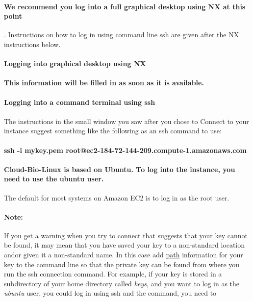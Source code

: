 \paragraph{We recommend you log into a full graphical desktop using NX at this point}. Instructions on how to log in using command line ssh are given after the NX instructions below.

\label{section:nx}
\paragraph{}\textbf{Logging into graphical desktop using NX}

\paragraph{This information will be filled in as soon as it is available.}


\paragraph{}\textbf{Logging into a command terminal using ssh}

\paragraph{}The instructions in the small window you saw after you chose to Connect to your instance suggest something like the following as an ssh command to use:

\paragraph{ssh -i mykey.pem root@ec2-184-72-144-209.compute-1.amazonaws.com}

\paragraph{Cloud-Bio-Linux is based on Ubuntu. To log into the instance, you need to \textbf{use the ubuntu user}.} The default for most systems on Amazon EC2 is to log in as the root user. 


\paragraph{Note:} If you get a warning when you try to connect that suggests that your key cannot be found, it may mean that you have saved your key to a non-standard location and\/or given it a non-standard name. In this case add \href{http://nebc.nerc.ac.uk/tools/bio-linux/bio-linux-faq\#path}{path} information for your key to the command line so that the private key can be found from where you run the ssh connection command. For example, if your key is stored in a subdirectory of your home directory called \emph{keys}, and you want to log in as the \emph{ubuntu} user, you could log in using ssh and the command, you need to

